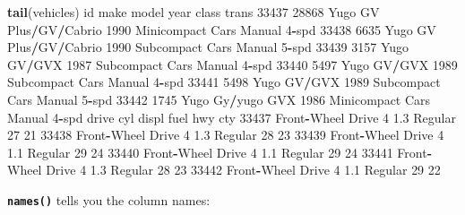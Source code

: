 \documentclass[
]{book}
\newenvironment{Shaded}{\begin{snugshade}}{\end{snugshade}}
\newcommand{\DecValTok}[1]{\textcolor[rgb]{0.00,0.00,0.81}{#1}}
\newcommand{\FloatTok}[1]{\textcolor[rgb]{0.00,0.00,0.81}{#1}}
\newcommand{\KeywordTok}[1]{\textcolor[rgb]{0.13,0.29,0.53}{\textbf{#1}}}
\newcommand{\NormalTok}[1]{#1}
\newcommand{\OperatorTok}[1]{\textcolor[rgb]{0.81,0.36,0.00}{\textbf{#1}}}
\begin{document}
\begin{Shaded}
\begin{Highlighting}[]
\KeywordTok{tail}\NormalTok{(vehicles) }
\NormalTok{         id make             model year            class        trans}
\DecValTok{33437} \DecValTok{28868}\NormalTok{ Yugo GV Plus}\OperatorTok{/}\NormalTok{GV}\OperatorTok{/}\NormalTok{Cabrio }\DecValTok{1990}\NormalTok{ Minicompact Cars Manual }\DecValTok{4}\OperatorTok{-}\NormalTok{spd}
\DecValTok{33438}  \DecValTok{6635}\NormalTok{ Yugo GV Plus}\OperatorTok{/}\NormalTok{GV}\OperatorTok{/}\NormalTok{Cabrio }\DecValTok{1990}\NormalTok{  Subcompact Cars Manual }\DecValTok{5}\OperatorTok{-}\NormalTok{spd}
\DecValTok{33439}  \DecValTok{3157}\NormalTok{ Yugo            GV}\OperatorTok{/}\NormalTok{GVX }\DecValTok{1987}\NormalTok{  Subcompact Cars Manual }\DecValTok{4}\OperatorTok{-}\NormalTok{spd}
\DecValTok{33440}  \DecValTok{5497}\NormalTok{ Yugo            GV}\OperatorTok{/}\NormalTok{GVX }\DecValTok{1989}\NormalTok{  Subcompact Cars Manual }\DecValTok{4}\OperatorTok{-}\NormalTok{spd}
\DecValTok{33441}  \DecValTok{5498}\NormalTok{ Yugo            GV}\OperatorTok{/}\NormalTok{GVX }\DecValTok{1989}\NormalTok{  Subcompact Cars Manual }\DecValTok{5}\OperatorTok{-}\NormalTok{spd}
\DecValTok{33442}  \DecValTok{1745}\NormalTok{ Yugo       Gy}\OperatorTok{/}\NormalTok{yugo GVX }\DecValTok{1986}\NormalTok{ Minicompact Cars Manual }\DecValTok{4}\OperatorTok{-}\NormalTok{spd}
\NormalTok{                  drive cyl displ    fuel hwy cty}
\DecValTok{33437}\NormalTok{ Front}\OperatorTok{-}\NormalTok{Wheel Drive   }\DecValTok{4}   \FloatTok{1.3}\NormalTok{ Regular  }\DecValTok{27}  \DecValTok{21}
\DecValTok{33438}\NormalTok{ Front}\OperatorTok{-}\NormalTok{Wheel Drive   }\DecValTok{4}   \FloatTok{1.3}\NormalTok{ Regular  }\DecValTok{28}  \DecValTok{23}
\DecValTok{33439}\NormalTok{ Front}\OperatorTok{-}\NormalTok{Wheel Drive   }\DecValTok{4}   \FloatTok{1.1}\NormalTok{ Regular  }\DecValTok{29}  \DecValTok{24}
\DecValTok{33440}\NormalTok{ Front}\OperatorTok{-}\NormalTok{Wheel Drive   }\DecValTok{4}   \FloatTok{1.1}\NormalTok{ Regular  }\DecValTok{29}  \DecValTok{24}
\DecValTok{33441}\NormalTok{ Front}\OperatorTok{-}\NormalTok{Wheel Drive   }\DecValTok{4}   \FloatTok{1.3}\NormalTok{ Regular  }\DecValTok{28}  \DecValTok{23}
\DecValTok{33442}\NormalTok{ Front}\OperatorTok{-}\NormalTok{Wheel Drive   }\DecValTok{4}   \FloatTok{1.1}\NormalTok{ Regular  }\DecValTok{29}  \DecValTok{22}
\end{Highlighting}
\end{Shaded}

\textbf{\texttt{names()}} tells you the column names:
\end{document}
